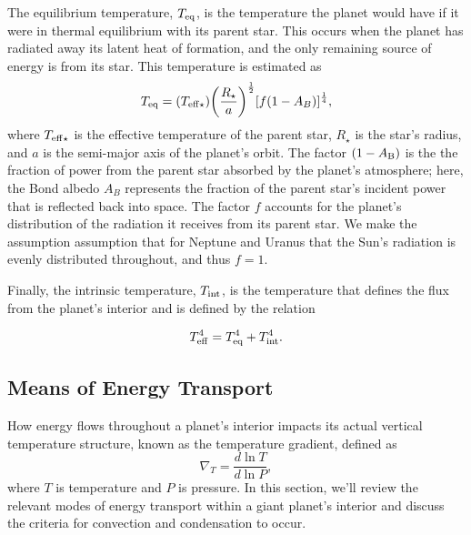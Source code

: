 \documentclass[11pt]{ucscthesisbs}
\begin{document}
The equilibrium temperature, $T_{\rm eq}$, is the temperature the planet would have if it were in thermal equilibrium with its parent star. This occurs when the planet has radiated away its latent heat of formation, and the only remaining source of energy is from its star. This temperature\citep{seager_2010} is estimated as
\begin{equation}
    T_{\rm eq} = (T_{\rm eff\star})\bigg(\frac{R_{\star}}{a}\bigg)^{\frac{1}{2}}[f(1-A_{B})]^{\frac{1}{4}},
  \label{eq:equilibrium_temp}
\end{equation} 
where $T_{\rm eff\star}$ is the effective temperature of the parent star, $R_{\star}$ is the star's radius, and $a$ is the semi-major axis of the planet's orbit. The factor $(1 - A_{\rm B})$ is the the fraction of power from the parent star absorbed by the planet's atmosphere; here, the Bond albedo $A_{B}$ represents the fraction of the parent star's incident power that is reflected back into space. The factor $f$ accounts for the planet's distribution of the radiation it receives from its parent star. We make the assumption assumption that for Neptune and Uranus that the Sun's radiation is evenly distributed throughout, and thus $f = 1$. 

Finally, the intrinsic temperature, $T_{\rm int}$, is the temperature that defines the flux from the planet's interior and is defined by the relation

\begin{equation}
    T_{\rm eff}^4 =  T_{\rm eq}^4 +  T_{\rm int}^4.
  \label{eq:effective_temp}
\end{equation} 

\subsection{Means of Energy Transport}
How energy flows throughout a planet's interior impacts its actual vertical temperature structure, known as the temperature gradient, defined as
\begin{equation}
  \nabla_{T} = \frac{d \ln T}{d\ln P} ,
\end{equation}
where $T$ is temperature and $P$ is pressure. In this section, we'll review the relevant modes of energy transport within a giant planet's interior and discuss the criteria for convection and condensation to occur.
\end{document}
